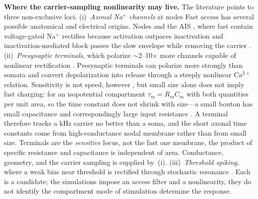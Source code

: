 \documentclass[11pt,a4paper]{article}
\providecommand{\DIFaddtex}[1]{{\protect\color{blue} \sf #1}} %
\providecommand{\DIFdeltex}[1]{{\protect\color{red} \scriptsize #1}} %
\providecommand{\DIFaddbegin}{} %
\providecommand{\DIFaddend}{} %
\providecommand{\DIFdelbegin}{} %
\providecommand{\DIFdelend}{} %
\providecommand{\DIFadd}[1]{\texorpdfstring{\DIFaddtex{#1}}{#1}} %
\providecommand{\DIFdel}[1]{\texorpdfstring{\DIFdeltex{#1}}{}} %
\begin{document}
\DIFdelbegin \DIFdel{\textbf{Where the carrier-sampling nonlinearity may live.} The literature points to three
non-exclusive loci. (i)~\emph{Axonal Na$^+$ channels} at nodes }\DIFdelend \DIFaddbegin \DIFadd{Fast access has several possible anatomical and electrical origins. Nodes }\DIFaddend and the
AIS \DIFdelbegin \DIFdel{, where fast
}\DIFdelend \DIFaddbegin \DIFadd{contain }\DIFaddend voltage-gated \DIFdelbegin \DIFdel{Na$^+$ rectifies because activation outpaces inactivation
\cite{mirzakhalili2020,wang2023}and inactivation-mediated block passes the slow envelope
while removing the carrier \cite{opancar2025}. (ii)~\emph{Presynaptic terminals}, which
polarize $\sim$2--10$\times$ more }\DIFdelend \DIFaddbegin \DIFadd{channels capable of nonlinear rectification
\cite{mirzakhalili2020,wang2023}. Presynaptic terminals can polarize more strongly
}\DIFaddend than somata \cite{rahman2013,aberra2023,chakraborty2018}\DIFdelbegin \DIFdel{and convert depolarization into release through a steeply nonlinear Ca$^{2+}$ relation.
Sensitivity is not speed, however}\DIFdelend \DIFaddbegin \DIFadd{, but small size alone does
not imply fast charging}\DIFaddend : for an isopotential \DIFdelbegin \DIFdel{compartment $\tau_m=R_mC_m$ with
both quantities per unit area, so the time constant does not shrink with size---a small
bouton has small capacitance and correspondingly large input resistance . A terminal
therefore tracks a kHz carrier no better than a soma, and the short axonal time constants
come from high-conductance nodal membrane rather than from small size. Terminals are the
\emph{sensitive} locus, not the fast one}\DIFdelend \DIFaddbegin \DIFadd{membrane, the product of specific
resistance and capacitance is independent of area. Conductance, geometry}\DIFaddend , and the
\DIFdelbegin \DIFdel{carrier sampling is supplied
by~(i). (iii)~\emph{Threshold spiking}, where a weak bias near threshold is rectified
through stochastic resonance \cite{liu2018,reato2010}. Each is a candidate; the simulations impose an access filter and a nonlinearity, they do not identify the
compartment}\DIFdelend \DIFaddbegin \DIFadd{mode of stimulation determine the response}\DIFaddend .
\end{document}
